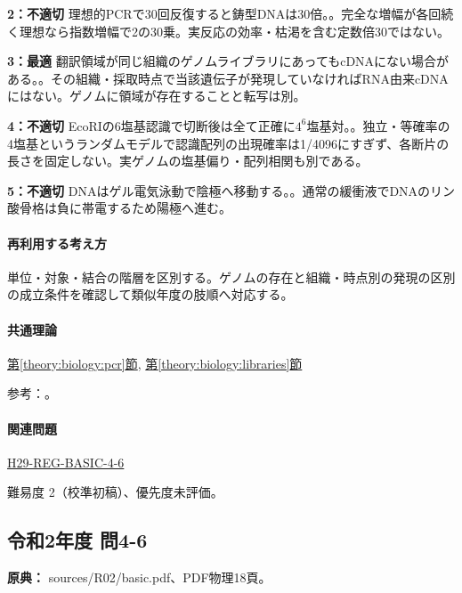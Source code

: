 \noindent\textbf{2：不適切} 理想的PCRで30回反復すると鋳型DNAは30倍。。完全な増幅が各回続く理想なら指数増幅で2の30乗。実反応の効率・枯渇を含む定数倍30ではない。\par

\noindent\textbf{3：最適} 翻訳領域が同じ組織のゲノムライブラリにあってもcDNAにない場合がある。。その組織・採取時点で当該遺伝子が発現していなければRNA由来cDNAにはない。ゲノムに領域が存在することと転写は別。\par

\noindent\textbf{4：不適切} EcoRIの6塩基認識で切断後は全て正確に\(4^6\)塩基対。。独立・等確率の4塩基というランダムモデルで認識配列の出現確率は1/4096にすぎず、各断片の長さを固定しない。実ゲノムの塩基偏り・配列相関も別である。\par

\noindent\textbf{5：不適切} DNAはゲル電気泳動で陰極へ移動する。。通常の緩衝液でDNAのリン酸骨格は負に帯電するため陽極へ進む。\par

\paragraph{再利用する考え方} 単位・対象・結合の階層を区別する。ゲノムの存在と組織・時点別の発現の区別の成立条件を確認して類似年度の肢順へ対応する。

\paragraph{共通理論} \hyperref[theory:biology:pcr]{第\ref*{theory:biology:pcr}節}, \hyperref[theory:biology:libraries]{第\ref*{theory:biology:libraries}節}

\par 参考：\cite{neb_pcr,fda_insulin,neb_ecori,nhgri_cdna}。

\paragraph{関連問題} \hyperref[q:h29-reg-basic-4-6]{H29-REG-BASIC-4-6}

\par 難易度 2（校準初稿）、優先度未評価。

\subsection{令和2年度 問4-6}
\label{q:r02-reg-basic-4-6}

\noindent\textbf{原典：} sources/R02/basic.pdf、PDF物理18頁。

